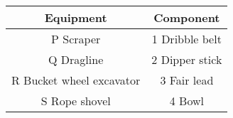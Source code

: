 \begin{center}
\renewcommand{\arraystretch}{1.25}
\begin{tabular}{ |c|c| }
\hline
\textbf{Equipment} & \textbf{Component} \\
\hline
P\; Scraper & 1\; Dribble belt \\ \hline
Q\; Dragline & 2\; Dipper stick \\ \hline
R\; Bucket wheel excavator & 3\; Fair lead \\ \hline
S\; Rope shovel & 4\; Bowl \\ \hline
\end{tabular}
\end{center}